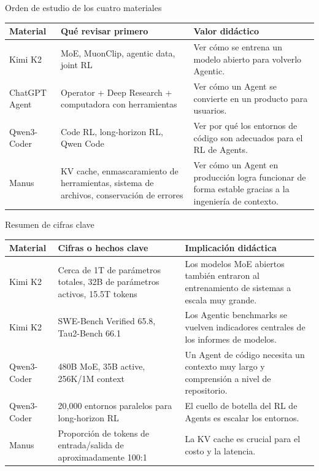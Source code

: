\documentclass[a4paper]{article}
\begin{document}
\begin{knowledgebox}{Orden de estudio de los cuatro materiales}
\begin{tabularx}{\textwidth}{p{}p{}X}
\toprule
Material & Qué revisar primero & Valor didáctico \\
\midrule
Kimi K2 & MoE, MuonClip, agentic data, joint RL & Ver cómo se entrena un modelo abierto para volverlo Agentic. \\
ChatGPT Agent & Operator + Deep Research + computadora con herramientas & Ver cómo un Agent se convierte en un producto para usuarios. \\
Qwen3-Coder & Code RL, long-horizon RL, Qwen Code & Ver por qué los entornos de código son adecuados para el RL de Agents. \\
Manus & KV cache, enmascaramiento de herramientas, sistema de archivos, conservación de errores & Ver cómo un Agent en producción logra funcionar de forma estable gracias a la ingeniería de contexto. \\
\bottomrule
\end{tabularx}
\end{knowledgebox}

\begin{knowledgebox}{Resumen de cifras clave}
\begin{tabularx}{\textwidth}{p{}p{}X}
\toprule
Material & Cifras o hechos clave & Implicación didáctica \\
\midrule
Kimi K2 & Cerca de 1T de parámetros totales, 32B de parámetros activos, 15.5T tokens & Los modelos MoE abiertos también entraron al entrenamiento de sistemas a escala muy grande. \\
Kimi K2 & SWE-Bench Verified 65.8, Tau2-Bench 66.1 & Los Agentic benchmarks se vuelven indicadores centrales de los informes de modelos. \\
Qwen3-Coder & 480B MoE, 35B active, 256K/1M context & Un Agent de código necesita un contexto muy largo y comprensión a nivel de repositorio. \\
Qwen3-Coder & 20,000 entornos paralelos para long-horizon RL & El cuello de botella del RL de Agents es escalar los entornos. \\
Manus & Proporción de tokens de entrada/salida de aproximadamente 100:1 & La KV cache es crucial para el costo y la latencia. \\
\bottomrule
\end{tabularx}
\end{knowledgebox}
\end{document}
